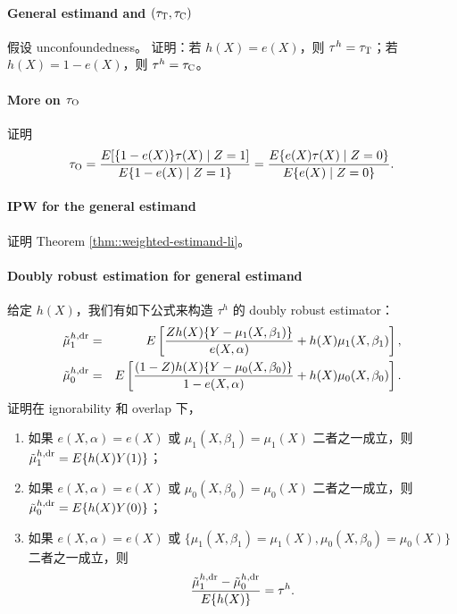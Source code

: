 \paragraph{General estimand and $(\tau_\textsc{T}, \tau_\textsc{C})$}\label{problem::general-estimand-att-atc}


假设 unconfoundedness。
证明：若 $h(X) = e(X)$，则 $\tau^h = \tau_\textsc{T}$；若 $h(X) = 1-  e(X)$，则 $\tau^h = \tau_\textsc{C}$。


\paragraph{More on $\tau_\textsc{O}$}\label{problem::ATO-treated-control}

证明
$$
\tau_\textsc{O} 
=  \frac{   E  [   \{1-e(X)\} \tau(X) \mid Z=1   ]      }{  E  \{ 1-e(X) \mid Z=1   \}   }
=  \frac{   E  \{ e(X) \tau(X) \mid Z=0   \}      }{  E  \{ e(X) \mid Z=0   \}   }.
$$



\paragraph{IPW for the general estimand}\label{problem::general-estimand-li}

证明 Theorem \ref{thm::weighted-estimand-li}。


\paragraph{Doubly robust estimation for general estimand}\label{problem::general-estimand-dr}


给定 $h(X)$，我们有如下公式来构造 $\tau^h$ 的 doubly robust estimator：
\begin{eqnarray*}
\tilde{\mu}_1^{h,\textup{dr}} &=& E\left[   \frac{Zh(X)  \{ Y-\mu_1(X,\beta_1)   \}}{  e(X,\alpha) }   + h(X) \mu_1(X, \beta_1)  \right] ,  \\
\tilde{\mu}_0^{h, \textup{dr}} &=& E\left[   \frac{(1-Z) h(X)  \{ Y-\mu_0(X,\beta_0) \}}{  1-e(X,\alpha) }   + h(X) \mu_0(X, \beta_0)  \right]  .  
\end{eqnarray*}
证明在 ignorability 和 overlap 下，
\begin{enumerate}
\item
如果 $e(X,\alpha) = e(X)$ 或 $\mu_1(X, \beta_1) = \mu_1(X)$ 二者之一成立，则 $\tilde{\mu}_1^{h,\textup{dr}}= E\{  h(X)  Y(1) \}$；
\item
如果 $e(X,\alpha) = e(X)$ 或 $\mu_0(X, \beta_0) = \mu_0(X)$ 二者之一成立，则 $\tilde{\mu}_0^{h, \textup{dr}}= E\{ h(X)  Y(0) \}$；
\item 
如果 $e(X,\alpha) = e(X)$ 或 $\{\mu_1(X, \beta_1) = \mu_1(X),   \mu_0(X, \beta_0) = \mu_0(X)\}$ 二者之一成立，则
$$
\frac{\tilde{\mu}_1^{h,\textup{dr}}  -\tilde{\mu}_0^{h, \textup{dr}}  }{  E\{ h(X)  \}  }
= \tau^h .
$$
\end{enumerate}

